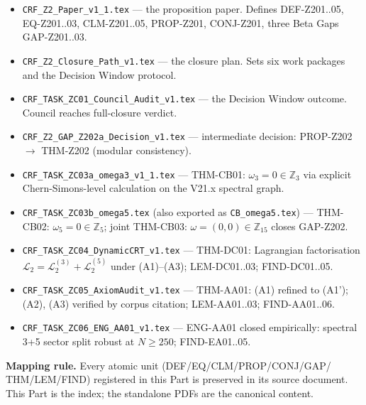 \documentclass[12pt, a4paper]{article}
\begin{document}
\begin{formalbox}[title={Source Trace --- 8 Standalone Z2-Stage Documents}]
\begin{itemize}[leftmargin=*]
\item \texttt{CRF\_Z2\_Paper\_v1\_1.tex} --- the proposition paper.
  Defines DEF-Z201..05, EQ-Z201..03, CLM-Z201..05, PROP-Z201,
  CONJ-Z201, three Beta Gaps GAP-Z201..03.
\item \texttt{CRF\_Z2\_Closure\_Path\_v1.tex} --- the closure plan.
  Sets six work packages and the Decision Window protocol.
\item \texttt{CRF\_TASK\_ZC01\_Council\_Audit\_v1.tex} --- the
  Decision Window outcome. Council reaches full-closure verdict.
\item \texttt{CRF\_Z2\_GAP\_Z202a\_Decision\_v1.tex} ---
  intermediate decision: PROP-Z202 $\to$ THM-Z202 (modular consistency).
\item \texttt{CRF\_TASK\_ZC03a\_omega3\_v1\_1.tex} --- THM-CB01:
  $\omega_3 = 0 \in \mathbb{Z}_3$ via explicit Chern-Simons-level
  calculation on the V21.x spectral graph.
\item \texttt{CRF\_TASK\_ZC03b\_omega5.tex} (also exported as
  \texttt{CB\_omega5.tex}) --- THM-CB02: $\omega_5 = 0 \in \mathbb{Z}_5$;
  joint THM-CB03: $\omega = (0,0) \in \mathbb{Z}_{15}$ closes GAP-Z202.
\item \texttt{CRF\_TASK\_ZC04\_DynamicCRT\_v1.tex} --- THM-DC01:
  Lagrangian factorisation $\mathcal{L}_2 = \mathcal{L}_2^{(3)} +
  \mathcal{L}_2^{(5)}$ under (A1)--(A3); LEM-DC01..03; FIND-DC01..05.
\item \texttt{CRF\_TASK\_ZC05\_AxiomAudit\_v1.tex} --- THM-AA01:
  (A1) refined to (A1'); (A2), (A3) verified by corpus citation;
  LEM-AA01..03; FIND-AA01..06.
\item \texttt{CRF\_TASK\_ZC06\_ENG\_AA01\_v1.tex} --- ENG-AA01
  closed empirically: spectral 3+5 sector split robust at $N \ge 250$;
  FIND-EA01..05.
\end{itemize}
\textbf{Mapping rule.} Every atomic unit (DEF/EQ/CLM/PROP/CONJ/GAP/
THM/LEM/FIND) registered in this Part is preserved in its source
document. This Part is the index; the standalone PDFs are the
canonical content.
\end{formalbox}
\end{document}
